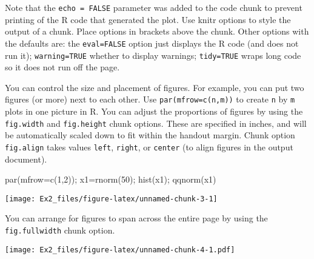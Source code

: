 \documentclass[
  11pt,
]{article}
\newenvironment{Shaded}{\begin{snugshade}}{\end{snugshade}}
\newcommand{\AttributeTok}[1]{\textcolor[rgb]{0.77,0.63,0.00}{#1}}
\newcommand{\DecValTok}[1]{\textcolor[rgb]{0.00,0.00,0.81}{#1}}
\newcommand{\FunctionTok}[1]{\textcolor[rgb]{0.00,0.00,0.00}{#1}}
\newcommand{\NormalTok}[1]{#1}
\newcommand{\OtherTok}[1]{\textcolor[rgb]{0.56,0.35,0.01}{#1}}
\newcommand{\SpecialCharTok}[1]{\textcolor[rgb]{0.00,0.00,0.00}{#1}}
\newcommand{\StringTok}[1]{\textcolor[rgb]{0.31,0.60,0.02}{#1}}
\begin{document}
Note that the \texttt{echo\ =\ FALSE} parameter was added to the code
chunk to prevent printing of the R code that generated the plot. Use
knitr options to style the output of a chunk. Place options in brackets
above the chunk. Other options with the defaults are: the
\texttt{eval=FALSE} option just displays the R code (and does not run
it); \texttt{warning=TRUE} whether to display warnings;
\texttt{tidy=TRUE} wraps long code so it does not run off the page.

You can control the size and placement of figures. For example, you can
put two figures (or more) next to each other. Use
\texttt{par(mfrow=c(n,m))} to create \texttt{n} by \texttt{m} plots in
one picture in R. You can adjust the proportions of figures by using the
\texttt{fig.width} and \texttt{fig.height} chunk options. These are
specified in inches, and will be automatically scaled down to fit within
the handout margin. Chunk option \texttt{fig.align} takes values
\texttt{left}, \texttt{right}, or \texttt{center} (to align figures in
the output document).

\begin{Shaded}
\begin{Highlighting}[]
\FunctionTok{par}\NormalTok{(}\AttributeTok{mfrow=}\FunctionTok{c}\NormalTok{(}\DecValTok{1}\NormalTok{,}\DecValTok{2}\NormalTok{)); x1}\OtherTok{=}\FunctionTok{rnorm}\NormalTok{(}\DecValTok{50}\NormalTok{); }\FunctionTok{hist}\NormalTok{(x1); }\FunctionTok{qqnorm}\NormalTok{(x1)}
\end{Highlighting}
\end{Shaded}

\begin{center}\texttt{[image: Ex2\_files/figure-latex/unnamed-chunk-3-1]} \end{center}

You can arrange for figures to span across the entire page by using the
\texttt{fig.fullwidth} chunk option.

\begin{Shaded}
\end{Shaded}

\texttt{[image: Ex2\_files/figure-latex/unnamed-chunk-4-1.pdf]}
\end{document}
